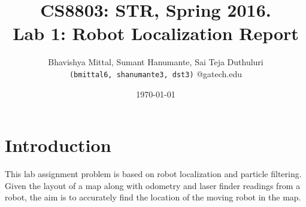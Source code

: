 \documentclass{article}
\begin{document}
\title{CS8803: STR, Spring 2016. \\Lab 1: Robot Localization Report}
\author{
  Bhavishya Mittal, Sumant Hanumante, Sai Teja Duthuluri\\
  \texttt{(bmittal6, shanumante3, dst3)} @gatech.edu
}

\date{\today}

\maketitle

\section{Introduction}
This lab assignment problem is based on robot localization and particle filtering. Given the layout of a map along with odometry and laser finder readings from a robot, the aim is to accurately find the location of the moving robot in the map.
\end{document}

